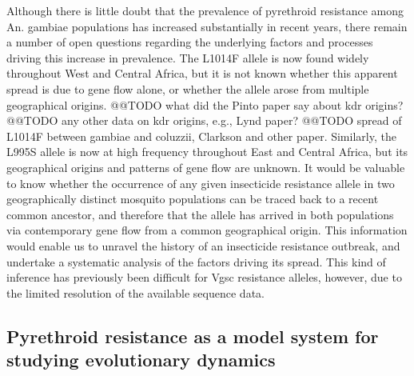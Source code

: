 \documentclass[a4paper,11pt,abstracton,hidelinks]{scrartcl}
\begin{document}
%
Although there is little doubt that the prevalence of pyrethroid resistance among An. gambiae populations has increased substantially in recent years, there remain a number of open questions regarding the underlying factors and processes driving this increase in prevalence.
%
The L1014F allele is now found widely throughout West and Central Africa, but it is not known whether this apparent spread is due to gene flow alone, or whether the allele arose from multiple geographical origins.
%
@@TODO what did the Pinto paper say about kdr origins? @@TODO any other data on kdr origins, e.g., Lynd paper?
%
@@TODO spread of L1014F between gambiae and coluzzii, Clarkson and other paper.
%
Similarly, the L995S allele is now at high frequency throughout East and Central Africa, but its geographical origins and patterns of gene flow are unknown.
%
It would be valuable to know whether the occurrence of any given insecticide resistance allele in two geographically distinct mosquito populations can be traced back to a recent common ancestor, and therefore that the allele has arrived in both populations via contemporary gene flow from a common geographical origin.
%
This information would enable us to unravel the history of an insecticide resistance outbreak, and undertake a systematic analysis of the factors driving its spread.
%
This kind of inference has previously been difficult for Vgsc resistance alleles, however, due to the limited resolution of the available sequence data.


\subsection*{Pyrethroid resistance as a model system for studying evolutionary dynamics}
\end{document}
